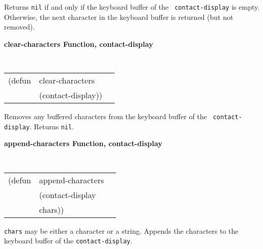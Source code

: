 \documentclass[twoside]{book}
\begin{document}
\begin{sloppy}
{\begin{flushright}
{}\end{flushright}}

\begin{flushright} \parbox[t]{6.125in}{
Returns {\tt nil} if and only if the keyboard buffer of the {\tt
contact-display} is empty. Otherwise, the next character in the keyboard buffer
is returned (but not removed).

}\end{flushright}

{\samepage
{\large {\bf clear-characters \hfill Function, contact-display}}
\begin{flushright} \parbox[t]{6.125in}{
\tt
\begin{tabular}{lll}
\raggedright
(defun & clear-characters & \\
& (contact-display))
\end{tabular}
\rm

}\end{flushright}}

\begin{flushright} \parbox[t]{6.125in}{
Removes any buffered characters from the keyboard buffer of the {\tt
contact-display}. Returns {\tt nil}.
 
}
\end{flushright}

{\samepage
{\large {\bf append-characters \hfill Function, contact-display}}
\begin{flushright} \parbox[t]{6.125in}{
\tt
\begin{tabular}{lll}
\raggedright
(defun & append-characters & \\
& (contact-display\\
& chars))
\end{tabular}
\rm

}\end{flushright}}

\begin{flushright} \parbox[t]{6.125in}{
{\tt chars} may be either a character or a string. Appends the characters
to the keyboard buffer of the {\tt contact-display}.
 
}
\end{flushright}



\end{sloppy}
\end{document}
